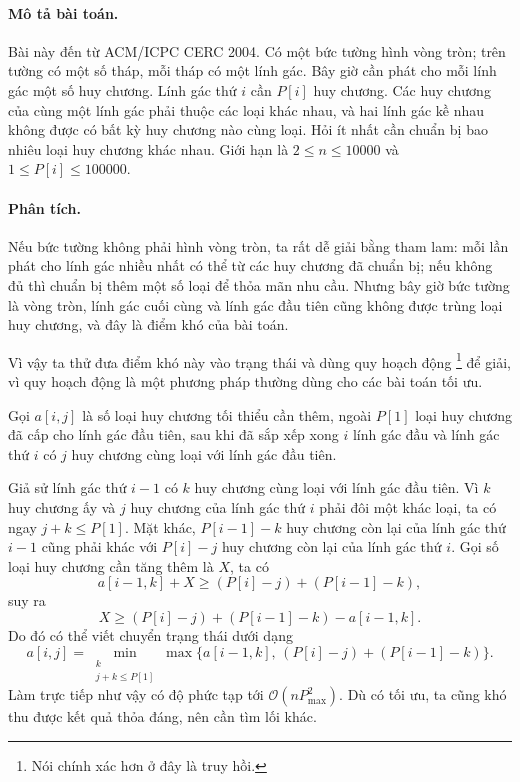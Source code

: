 \documentclass[11pt]{article}
\newcommand{\Oh}{\mathcal{O}}
\begin{document}
\paragraph{Mô tả bài toán.}
Bài này đến từ ACM/ICPC CERC 2004. Có một bức tường hình vòng tròn; trên
tường có một số tháp, mỗi tháp có một lính gác. Bây giờ cần phát cho mỗi lính
gác một số huy chương. Lính gác thứ $i$ cần $P[i]$ huy chương. Các huy chương
của cùng một lính gác phải thuộc các loại khác nhau, và hai lính gác kề nhau
không được có bất kỳ huy chương nào cùng loại. Hỏi ít nhất cần chuẩn bị bao
nhiêu loại huy chương khác nhau. Giới hạn là $2\le n\le 10000$ và
$1\le P[i]\le 100000$.

\paragraph{Phân tích.}
Nếu bức tường không phải hình vòng tròn, ta rất dễ giải bằng tham lam: mỗi lần
phát cho lính gác nhiều nhất có thể từ các huy chương đã chuẩn bị; nếu không
đủ thì chuẩn bị thêm một số loại để thỏa mãn nhu cầu. Nhưng bây giờ bức tường
là vòng tròn, lính gác cuối cùng và lính gác đầu tiên cũng không được trùng
loại huy chương, và đây là điểm khó của bài toán.

Vì vậy ta thử đưa điểm khó này vào trạng thái và dùng quy hoạch động
\footnote{Nói chính xác hơn ở đây là truy hồi.} để giải, vì quy hoạch động là
một phương pháp thường dùng cho các bài toán tối ưu.

Gọi $a[i,j]$ là số loại huy chương tối thiểu cần thêm, ngoài $P[1]$ loại huy
chương đã cấp cho lính gác đầu tiên, sau khi đã sắp xếp xong $i$ lính gác đầu
và lính gác thứ $i$ có $j$ huy chương cùng loại với lính gác đầu tiên.

Giả sử lính gác thứ $i-1$ có $k$ huy chương cùng loại với lính gác đầu tiên.
Vì $k$ huy chương ấy và $j$ huy chương của lính gác thứ $i$ phải đôi một khác
loại, ta có ngay $j+k\le P[1]$. Mặt khác, $P[i-1]-k$ huy chương còn lại của
lính gác thứ $i-1$ cũng phải khác với $P[i]-j$ huy chương còn lại của lính
gác thứ $i$. Gọi số loại huy chương cần tăng thêm là $X$, ta có
\[
  a[i-1,k]+X \ge (P[i]-j)+(P[i-1]-k),
\]
suy ra
\[
  X \ge (P[i]-j)+(P[i-1]-k)-a[i-1,k].
\]
Do đó có thể viết chuyển trạng thái dưới dạng
\[
  a[i,j]=
  \min_{\substack{k\\ j+k\le P[1]}}
  \max\{a[i-1,k],\, (P[i]-j)+(P[i-1]-k)\}.
\]
Làm trực tiếp như vậy có độ phức tạp tới $\Oh(nP_{\max}^2)$. Dù có tối ưu,
ta cũng khó thu được kết quả thỏa đáng, nên cần tìm lối khác.
\end{document}
